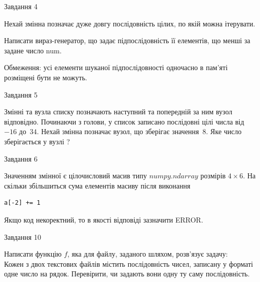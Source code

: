 \documentclass[12pt, ukrainian]{article}
\begin{document}
{\begin{minipage}[t]{8.0cm}
\begin{verbatim}
\end{verbatim}            

\end{minipage}


               
{\begin{center}Завдання {4}\end{center}}
\vspace{-4mm}
Нехай змінна  позначає дуже довгу послідовність цілих, по якій можна ітерувати.

Написати вираз-генератор, що задає підпослідовність її елементів, що менші за задане число num.

Обмеження: усі елементи шуканої підпослідовності одночасно в пам'яті розміщені бути не можуть.\par

\vspace{10mm}
               
{\begin{center}Завдання {5}\end{center}}
\vspace{-4mm}
Змінні  та  вузла списку позначають наступний та попередній за ним вузол відповідно. Починаючи з голови, у список записано послідовні цілі числа від~$-16$ до~$34$. Нехай змінна  позначає вузол, що зберігає значення~$8$.
Яке число зберігається у вузлі  ?\par

               
{\begin{center}Завдання {6}\end{center}}
\vspace{-4mm}
Значенням змінної  є цілочисловий масив типу $numpy.ndarray$ розмірів $4{\times}6$. На скільки збільшиться сума елементів масиву  після виконання
\begin{verbatim}
a[-2] += 1
\end{verbatim}


Якщо код некоректний, то в якості відповіді зазначити ERROR.\par

               
{\begin{center}Завдання {10}\end{center}}
\vspace{-4mm}

Написати функцію $f$, яка для файлу, заданого шляхом, розв’язує задачу:\\ Кожен з двох текстових файлів містить послідовність чисел, записану у форматі одне число на рядок.  Перевірити, чи задають вони одну ту саму послідовність.

}
\end{document}
